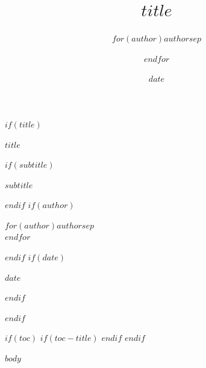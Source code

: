 \documentclass[
$for(babel-otherlangs)$  $babel-otherlangs$,
$endfor$$if(babel-lang)$  $babel-lang$,
$endif$$if(fontsize)$  $fontsize$,
$endif$$if(papersize)$  $papersize$paper,
$endif$$for(classoption)$  $classoption$,
$endfor$]{book}
\title{$title$}
\author{$for(author)$$author$$sep$ \and $endfor$}
\date{$date$}
\begin{document}
\frontmatter
$if(title)$
\begin{titlepage}
\centering
\vspace*{0.22\textheight}
{\Huge\bfseries $title$\par}
$if(subtitle)$
\vspace{0.8cm}
{\Large\itshape $subtitle$\par}
$endif$
\vspace{1.6cm}
$if(author)$
{\large $for(author)$$author$$sep$\\$endfor$\par}
$endif$
\vfill
$if(date)$
{\large $date$\par}
$endif$
\end{titlepage}
$endif$

$if(toc)$
$if(toc-title)$
\renewcommand*\contentsname{$toc-title$}
$endif$
\setcounter{tocdepth}{$if(toc-depth)$$toc-depth$$else$2$endif$}
\tableofcontents
$endif$

\mainmatter
$body$

\backmatter
\end{document}

